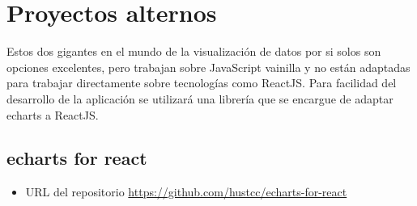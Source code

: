\section{ Proyectos alternos }
Estos dos gigantes en el mundo de la visualización de datos por si solos son opciones excelentes, pero trabajan sobre JavaScript vainilla y no están adaptadas para trabajar directamente sobre tecnologías como ReactJS. 
Para facilidad del desarrollo de la aplicación se utilizará una librería que se encargue de adaptar echarts a ReactJS.

\subsection{ echarts for react }
\begin{itemize}
    \item URL del repositorio \href{https://github.com/hustcc/echarts-for-react}{https://github.com/hustcc/echarts-for-react}
\end{itemize}